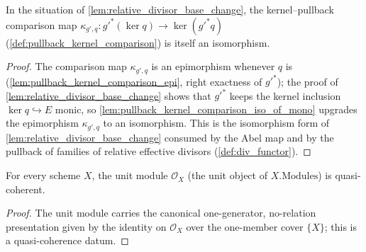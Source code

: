 \begin{lemma}\leanok
  \label{lem:relative_divisor_base_change_comparison_iso}
  In the situation of \cref{lem:relative_divisor_base_change}, the
  kernel--pullback comparison map
  \(\kappa_{g',q} : g'^{*}(\ker q) \to \ker(g'^{*} q)\)
  (\cref{def:pullback_kernel_comparison}) is itself an isomorphism.
\end{lemma}
\begin{proof}\leanok
  The comparison map \(\kappa_{g',q}\) is an epimorphism whenever \(q\)
  is (\cref{lem:pullback_kernel_comparison_epi}, right exactness of
  \(g'^{*}\)); the proof of \cref{lem:relative_divisor_base_change} shows
  that \(g'^{*}\) keeps the kernel inclusion \(\ker q \hookrightarrow E\)
  monic, so \cref{lem:pullback_kernel_comparison_iso_of_mono} upgrades
  the epimorphism \(\kappa_{g',q}\) to an isomorphism. This is the
  isomorphism form of \cref{lem:relative_divisor_base_change} consumed by
  the Abel map and by the pullback of families of relative effective
  divisors (\cref{def:div_functor}).
\end{proof}

\begin{lemma}\leanok
  \label{lem:unit_isQuasicoherent}
  For every scheme \(X\), the unit module \(\mathcal O_X\) (the unit object
  of \(X.\mathrm{Modules}\)) is quasi-coherent.
\end{lemma}
\begin{proof}\leanok
  The unit module carries the canonical one-generator, no-relation
  presentation given by the identity on \(\mathcal O_X\) over the
  one-member cover \(\{X\}\); this is a quasi-coherence datum.
\end{proof}

